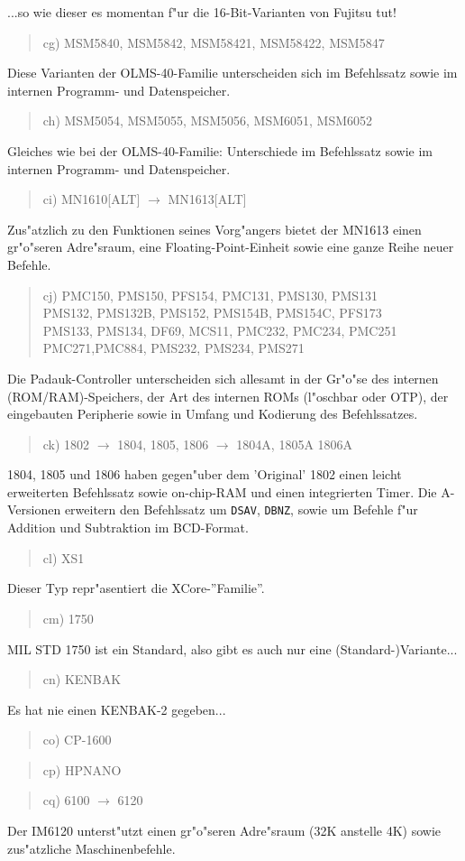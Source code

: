 \documentclass[12pt,a4paper,twoside]{report}
\newcommand{\tty}[1]{{\tt #1}}
\begin{document}
...so wie dieser es momentan f"ur die 16-Bit-Varianten von Fujitsu tut!
\begin{quote}
cg) MSM5840, MSM5842, MSM58421, MSM58422, MSM5847
\end{quote}
Diese Varianten der OLMS-40-Familie unterscheiden sich im
Befehlssatz sowie im internen Programm- und Datenspeicher.
\begin{quote}
ch) MSM5054, MSM5055, MSM5056, MSM6051, MSM6052
\end{quote}
Gleiches wie bei der OLMS-40-Familie: Unterschiede im
Befehlssatz sowie im internen Programm- und Datenspeicher.
\begin{quote}
ci) MN1610[ALT] $\rightarrow$ MN1613[ALT]
\end{quote}
Zus"atzlich zu den Funktionen seines Vorg"angers bietet der
MN1613 einen gr"o"seren Adre"sraum, eine Floating-Point-Einheit
sowie eine ganze Reihe neuer Befehle.
\begin{quote}
cj) PMC150, PMS150, PFS154, PMC131, PMS130, PMS131 \\
PMS132, PMS132B, PMS152, PMS154B, PMS154C, PFS173 \\
PMS133, PMS134, DF69, MCS11, PMC232, PMC234, PMC251 \\
PMC271,PMC884, PMS232, PMS234, PMS271
\end{quote}
Die Padauk-Controller unterscheiden sich allesamt in
der Gr"o"se des internen (ROM/RAM)-Speichers, der Art
des internen ROMs (l"oschbar oder OTP), der eingebauten
Peripherie sowie in Umfang und Kodierung des Befehlssatzes.
\begin{quote}
ck) 1802 $\rightarrow$ 1804, 1805, 1806 $\rightarrow$ 1804A, 1805A
1806A
\end{quote}
1804, 1805 und 1806 haben gegen"uber dem 'Original' 1802 einen leicht
erweiterten Befehlssatz sowie on-chip-RAM und einen integrierten
Timer.  Die A-Versionen erweitern den Befehlssatz um \tty{DSAV},
\tty{DBNZ}, sowie um Befehle f"ur Addition und Subtraktion im
BCD-Format.
\begin{quote}
cl) XS1
\end{quote}
Dieser Typ repr"asentiert die XCore-''Familie''.
\begin{quote}
cm) 1750
\end{quote}
MIL STD 1750 ist ein Standard, also gibt es auch nur eine
(Standard-)Variante...
\begin{quote}
cn) KENBAK
\end{quote}
Es hat nie einen KENBAK-2 gegeben...
\begin{quote}
co) CP-1600
\end{quote}
\begin{quote}
cp) HPNANO
\end{quote}
\begin{quote}
cq) 6100 $\rightarrow$ 6120
\end{quote}
Der IM6120 unterst"utzt einen gr"o"seren Adre"sraum (32K
anstelle 4K) sowie zus"atzliche Maschinenbefehle.
\end{document}
